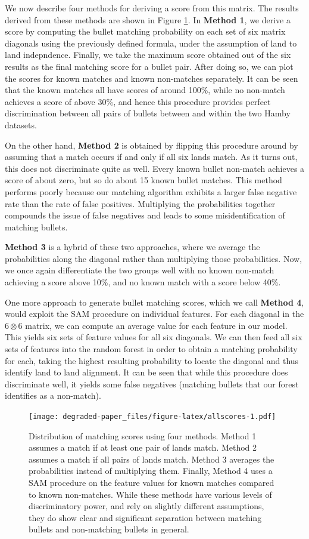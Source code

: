 \documentclass[12pt,]{article}
\theoremstyle{definition}
\theoremstyle{definition}
\theoremstyle{definition}
\theoremstyle{remark}
\begin{document}
We now describe four methods for deriving a score from this matrix. The
results derived from these methods are shown in Figure
\ref{fig:allscores}. In \textbf{Method 1}, we derive a score by
computing the bullet matching probability on each set of six matrix
diagonals using the previously defined formula, under the assumption of
land to land indepndence. Finally, we take the maximum score obtained
out of the six results as the final matching score for a bullet pair.
After doing so, we can plot the scores for known matches and known
non-matches separately. It can be seen that the known matches all have
scores of around 100\%, while no non-match achieves a score of above
30\%, and hence this procedure provides perfect discrimination between
all pairs of bullets between and within the two Hamby datasets.

On the other hand, \textbf{Method 2} is obtained by flipping this
procedure around by assuming that a match occurs if and only if all six
lands match. As it turns out, this does not discriminate quite as well.
Every known bullet non-match achieves a score of about zero, but so do
about 15 known bullet matches. This method performs poorly because our
matching algorithm exhibits a larger false negative rate than the rate
of false positives. Multiplying the probabilities together compounds the
issue of false negatives and leads to some misidentification of matching
bullets.

\textbf{Method 3} is a hybrid of these two approaches, where we average
the probabilities along the diagonal rather than multiplying those
probabilities. Now, we once again differentiate the two groups well with
no known non-match achieving a score above 10\%, and no known match with
a score below 40\%.

One more approach to generate bullet matching scores, which we call
\textbf{Method 4}, would exploit the SAM procedure on individual
features. For each diagonal in the \(6 \otimes 6\) matrix, we can
compute an average value for each feature in our model. This yields six
sets of feature values for all six diagonals. We can then feed all six
sets of features into the random forest in order to obtain a matching
probability for each, taking the highest resulting probability to locate
the diagonal and thus identify land to land alignment. It can be seen
that while this procedure does discriminate well, it yields some false
negatives (matching bullets that our forest identifies as a non-match).

\begin{figure}[htbp]
\centering
\texttt{[image: degraded-paper\_files/figure-latex/allscores-1.pdf]}
\caption{\label{fig:allscores}Distribution of matching scores using four
methods. Method 1 assumes a match if at least one pair of lands match.
Method 2 assumes a match if all pairs of lands match. Method 3 averages
the probabilities instead of multiplying them. Finally, Method 4 uses a
SAM procedure on the feature values for known matches compared to known
non-matches. While these methods have various levels of discriminatory
power, and rely on slightly different assumptions, they do show clear
and significant separation between matching bullets and non-matching
bullets in general.}
\end{figure}
\end{document}
